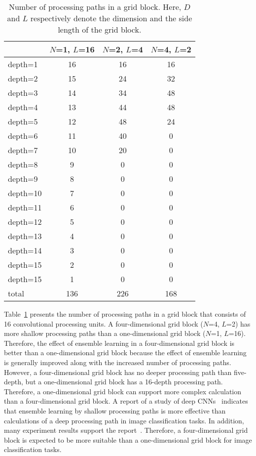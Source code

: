 \documentclass[10pt,twocolumn,letterpaper]{article}
\begin{document}
\begin{table}[t]
\centering
 \caption{Number of processing paths in a grid block.
 Here, $D$ and $L $ respectively denote the dimension and the side length of the grid block.}
 \label{table:path}
 \begin{tabular}{|l|c|c|c|}
  \hline
  & $N$=1, $L$=16 & $N$=2, $L$=4 & $N$=4, $L$=2 \\
  \hline
  depth=1 & 16 & 16 & 16 \\
  depth=2 & 15 & 24 & 32 \\
  depth=3 & 14 & 34 & 48 \\
  depth=4 & 13 & 44 & 48 \\
  depth=5 & 12 & 48 & 24 \\
  depth=6 & 11 & 40 & 0 \\
  depth=7 & 10 & 20 & 0 \\
  depth=8 & 9 & 0 & 0 \\
  depth=9 & 8 & 0 & 0 \\
  depth=10 & 7 & 0 & 0 \\
  depth=11 & 6 & 0 & 0 \\
  depth=12 & 5 & 0 & 0 \\
  depth=13 & 4 & 0 & 0 \\
  depth=14 & 3 & 0 & 0 \\
  depth=15 & 2 & 0 & 0 \\
  depth=15 & 1 & 0 & 0 \\
  \hline 
  total & 136 & 226 & 168 \\
  \hline 
 \end{tabular}
\end{table}

Table~\ref{table:path} presents the number of processing paths in a grid block that consists of 16 convolutional processing units.
A four-dimensional grid block ($N$=4, $L$=2) has more shallow processing paths than a one-dimensional grid block ($N$=1, $L$=16).
Therefore, the effect of ensemble learning in a four-dimensional grid block is better than a one-dimensional grid block
because the effect of ensemble learning is generally improved along with the increased number of processing paths.
However, a four-dimensional grid block has no deeper processing path than five-depth, but a one-dimensional grid block has a 16-depth processing path.
Therefore, a one-dimensional grid block can support more complex calculation than a four-dimensional grid block.
A report of a study of deep CNNs~\cite{ResNetBehave} indicates that ensemble learning by shallow processing paths is more effective than calculations of a deep processing path in image classification tasks.
In addition, many experiment results support the report~\cite{WideResNet}.
Therefore, a four-dimensional grid block is expected to be more suitable than a one-dimensional grid block for image classification tasks.
\end{document}
